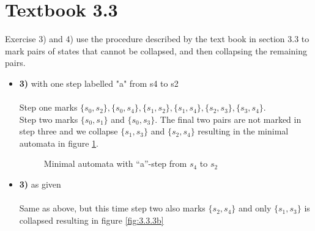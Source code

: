 \documentclass[defaultpackages]{simplereport}
\begin{document}
\section*{Textbook 3.3}
  Exercise 3) and 4) use the procedure described by the text book in section 3.3
  to mark pairs of states that cannot be collapsed, and then collapsing the
  remaining pairs.
\begin{itemize}[label=]
\item \textbf{3)} with one step labelled "a" from s4 to s2\\\\
  Step one marks $\{s_0, s_2\}, \{s_0, s_4\}, \{s_1, s_2\}, \{s_1, s_4\}, \{s_2,
  s_3\}, \{s_3, s_4\}$.\\
  Step two marks $\{s_0, s_1\}$ and $\{s_0, s_3\}$. The final two pairs are not
  marked in step three and we collapse $\{s_1, s_3\}$ and $\{s_2, s_4\}$
  resulting in the minimal automata in figure \ref{fig:3.3.3a}.
  \begin{figure}[H]
     \centering
     \caption{Minimal automata with ``a''-step from $s_4$ to $s_2$}
     \label{fig:3.3.3a}
  \end{figure}
\item \textbf{3)} as given\\\\
  Same as above, but this time step two also marks $\{s_2, s_4\}$ and only
  $\{s_1, s_3\}$ is collapsed resulting in figure \ref{fig:3.3.3b}
  \begin{figure}[H]
     \centering
\end{figure}
\end{itemize}
\end{document}
